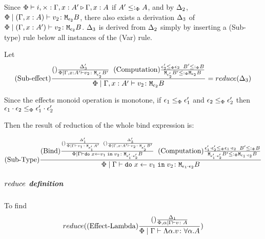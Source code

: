 {                Since $\Phi\vdash i,\times : \Gamma, x: A' \triangleright \Gamma, x: A$ if $A' \leq:_\Phi A$, and by $\Delta_2$, $\Phi\mid(\Gamma, x: A) \vdash v_2 \colon \texttt{M}_{\epsilon_2}{B}$, there also exists a derivation $\Delta_3$ of $\Phi\mid(\Gamma, x: A') \vdash v_2 \colon \texttt{M}_{\epsilon_2}{B}$. $\Delta_3$ is derived from $\Delta_2$ simply by inserting a (Sub-type) rule below all instances of the (Var) rule.

                Let \begin{equation}
                    (\text{Sub-effect}) \frac{
                        (\text{}) \frac{\Delta'_3}{\Phi\mid\Gamma, x: A' \vdash v_2 \colon \texttt{M}_{\epsilon'_2}{B'}}
                    \;\;
                    (\text{Computation}) \frac{ \epsilon_2'\leq_{\Phi} \epsilon_2\;\; B' \leq:_\Phi B }{\texttt{M}_{\epsilon_2'}{ B' }\leq:_\Phi\texttt{M}_{\epsilon_2}{B}}
                    }{
                        \Phi\mid\Gamma, x: A' \vdash v_2 \colon \texttt{M}_{\epsilon_2}{B}
                    } = reduce(\Delta_3)
                \end{equation}
                

                Since the effects monoid operation is monotone, if $\epsilon_1\leq_{\Phi}\epsilon_1'$ and $\epsilon_2\leq_{\Phi}\epsilon_2'$ then $\epsilon_1\cdot\epsilon_2 \leq_{\Phi} \epsilon_1'\cdot\epsilon_2'$
                


                Then the result of reduction of the whole bind expression is:


                \begin{equation}
                    (\text{Sub-Type}) \frac{
                        (\text{Bind}) \frac{
                            (\text{}) \frac{
                                \Delta'_1
                            }{
                                \Phi\mid\Gamma \vdash v_1 \colon \texttt{M}_{\epsilon_1'}{A'}
                            }
                            \;\;
                            (\text{}) \frac{
                                \Delta'_3
                            }{
                                \Phi\mid\Gamma, x: A' \vdash v_2 \colon \texttt{M}_{\epsilon_2'}{B'}
                            }
                        }{
                        \Phi\mid\Gamma \vdash \texttt{do}\; x \leftarrow v_1 \;\texttt{in}\; v_2 \colon \texttt{M}_{\epsilon_1'\cdot\epsilon_2'}{B}
                        }
                        \;\;
                        (\text{Computation}) \frac{ \epsilon_1'\cdot\epsilon_2'\leq_{\Phi} \epsilon_1\cdot\epsilon_2\;\; B' \leq:_\Phi B }{\texttt{M}_{\epsilon_1'\cdot\epsilon_2'}{ B' }\leq:_\Phi\texttt{M}_{\epsilon_1\cdot\epsilon_2}{B}}
                    }{
                        \Phi\mid\Gamma \vdash \texttt{do}\; x \leftarrow v_1 \;\texttt{in}\; v_2 \colon \texttt{M}_{\epsilon_1\cdot\epsilon_2}{B}
                    }
                \end{equation}

        \subparagraph{$reduce$ definition}

        
        To find 
        \begin{equation}
            reduce((\text{Effect-Lambda}) \frac{(\text{}) \frac{\Delta_1}{\Phi,\alpha\mid\Gamma \vdash v \colon A}}{\Phi\mid\Gamma \vdash \Lambda \alpha. v \colon \forall \alpha. A})
        \end{equation}

}
